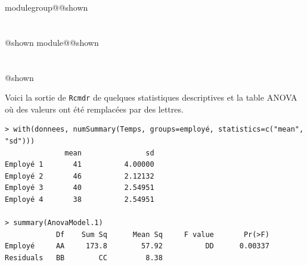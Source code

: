 \documentclass{Evaluation}
\makeatletter
\newcommand{\currentmodulekey}{}
\newcommand{\currentmoduletitle}{}
\newcommand{\currentgroupkey}{}
\newcommand{\currentgrouptitle}{}
\newcommand{\showmoduleifneeded}{%
  \ifx\currentgroupkey\empty\else
    \expandafter\ifx\csname modulegroup@\currentgroupkey @shown\endcsname\relax
      \section*{\currentgrouptitle}%
      \expandafter\gdef\csname modulegroup@\currentgroupkey @shown\endcsname{1}%
    \fi
  \fi
  \expandafter\ifx\csname module@\currentmodulekey @shown\endcsname\relax
    \section*{\currentmoduletitle}%
    \expandafter\gdef\csname module@\currentmodulekey @shown\endcsname{1}%
  \fi
}
\newenvironment{A23}{\showmoduleifneeded}{}
\makeatother
\begin{document}
\begin{questions}
\begin{A23}
Voici la sortie de \texttt{Rcmdr} de quelques statistiques descriptives et la table ANOVA où des valeurs ont été remplacées par des lettres.

\begin{verbatim} 
> with(donnees, numSummary(Temps, groups=employé, statistics=c("mean", "sd")))
              mean               sd
Employé 1       41          4.00000
Employé 2       46          2.12132
Employé 3       40          2.54951
Employé 4       38          2.54951

> summary(AnovaModel.1)
            Df    Sum Sq      Mean Sq     F value       Pr(>F)
Employé     AA     173.8        57.92          DD      0.00337
Residuals   BB        CC         8.38
\end{verbatim}

\end{A23}
\end{questions}
\end{document}

